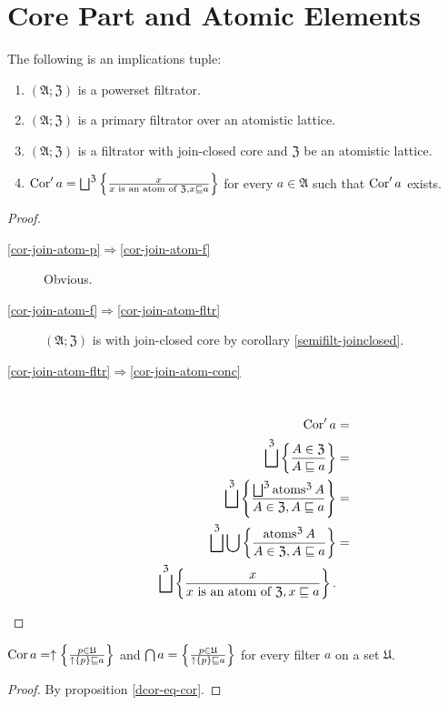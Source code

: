 \section{Core Part and Atomic Elements}
\begin{prop}
\label{cor-join-atom}The following is an implications tuple:
\begin{enumerate}
\item \label{cor-join-atom-p}$(\mathfrak{A};\mathfrak{Z})$ is a powerset
filtrator.
\item \label{cor-join-atom-f}$(\mathfrak{A};\mathfrak{Z})$ is a primary filtrator
over an atomistic lattice.
\item \label{cor-join-atom-fltr}$(\mathfrak{A};\mathfrak{Z})$ is a filtrator
with join-closed core and $\mathfrak{Z}$ be an atomistic lattice.
\item \label{cor-join-atom-conc}$\operatorname{Cor}'a=\bigsqcup^{\mathfrak{Z}}\left\{ \frac{x}{x\text{ is an atom of }\mathfrak{Z},x\sqsubseteq a}\right\}$
for every $a\in\mathfrak{A}$ such that $\operatorname{Cor}'a$ exists.
\end{enumerate}
\end{prop}
\begin{proof}
~
\begin{description}
\item [{\ref{cor-join-atom-p}$\Rightarrow$\ref{cor-join-atom-f}}] Obvious.
\item [{\ref{cor-join-atom-f}$\Rightarrow$\ref{cor-join-atom-fltr}}] $(\mathfrak{A};\mathfrak{Z})$
is with join-closed core by corollary \ref{semifilt-joinclosed}.
\item [{\ref{cor-join-atom-fltr}$\Rightarrow$\ref{cor-join-atom-conc}}] ~
\begin{align*}
\operatorname{Cor}'a & =\\
\bigsqcup^{\mathfrak{Z}}\left\{ \frac{A\in\mathfrak{Z}}{A\sqsubseteq a}\right\} & =\\
\bigsqcup^{\mathfrak{Z}}\left\{ \frac{\bigsqcup^{\mathfrak{Z}}\operatorname{atoms}^{\mathfrak{Z}}A}{A\in\mathfrak{Z},A\sqsubseteq a}\right\} & =\\
\bigsqcup^{\mathfrak{Z}}\bigcup\left\{ \frac{\operatorname{atoms}^{\mathfrak{Z}}A}{A\in\mathfrak{Z},A\sqsubseteq a}\right\} & =\\
\bigsqcup^{\mathfrak{Z}}\left\{ \frac{x}{x\text{ is an atom of }\mathfrak{Z},x\sqsubseteq a}\right\}.
\end{align*}

\end{description}
\end{proof}
\begin{cor}
$\operatorname{Cor} a=\uparrow\left\{ \frac{p\in\mathfrak{U}}{\uparrow\{p\}\sqsubseteq a}\right\}$
and $\bigcap a=\left\{ \frac{p\in\mathfrak{U}}{\uparrow\{p\}\sqsubseteq a}\right\}$
for every filter $a$ on a set $\mathfrak{U}$.\end{cor}
\begin{proof}
By proposition \ref{dcor-eq-cor}.
\end{proof}

